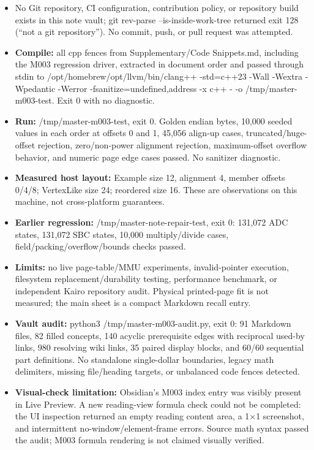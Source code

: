 \begin{itemize}
\tightlist
\item
  No Git repository, CI configuration, contribution policy, or repository build exists in this note vault; git rev-parse --is-inside-work-tree returned exit 128 (``not a git repository''). No commit, push, or pull request was attempted.
\item
  \textbf{Compile:} all cpp fences from Supplementary/Code Snippets.md, including the M003 regression driver, extracted in document order and passed through stdin to /opt/homebrew/opt/llvm/bin/clang++ -std=c++23 -Wall -Wextra -Wpedantic -Werror -fsanitize=undefined,address -x c++ - -o /tmp/master-m003-test. Exit 0 with no diagnostic.
\item
  \textbf{Run:} /tmp/master-m003-test, exit 0. Golden endian bytes, 10,000 seeded values in each order at offsets 0 and 1, 45,056 align-up cases, truncated/huge-offset rejection, zero/non-power alignment rejection, maximum-offset overflow behavior, and numeric page edge cases passed. No sanitizer diagnostic.
\item
  \textbf{Measured host layout:} Example size 12, alignment 4, member offsets 0/4/8; VertexLike size 24; reordered size 16. These are observations on this machine, not cross-platform guarantees.
\item
  \textbf{Earlier regression:} /tmp/master-note-repair-test, exit 0: 131,072 ADC states, 131,072 SBC states, 10,000 multiply/divide cases, field/packing/overflow/bounds checks passed.
\item
  \textbf{Limits:} no live page-table/MMU experiments, invalid-pointer execution, filesystem replacement/durability testing, performance benchmark, or independent Kairo repository audit. Physical printed-page fit is not measured; the main sheet is a compact Markdown recall entry.
\item
  \textbf{Vault audit:} python3 /tmp/master-m003-audit.py, exit 0: 91 Markdown files, 82 filled concepts, 140 acyclic prerequisite edges with reciprocal used-by links, 980 resolving wiki links, 35 paired display blocks, and 60/60 sequential part definitions. No standalone single-dollar boundaries, legacy math delimiters, missing file/heading targets, or unbalanced code fences detected.
\item
  \textbf{Visual-check limitation:} Obsidian's M003 index entry was visibly present in Live Preview. A new reading-view formula check could not be completed: the UI inspection returned an empty reading content area, a 1×1 screenshot, and intermittent no-window/element-frame errors. Source math syntax passed the audit; M003 formula rendering is not claimed visually verified.
\end{itemize}

